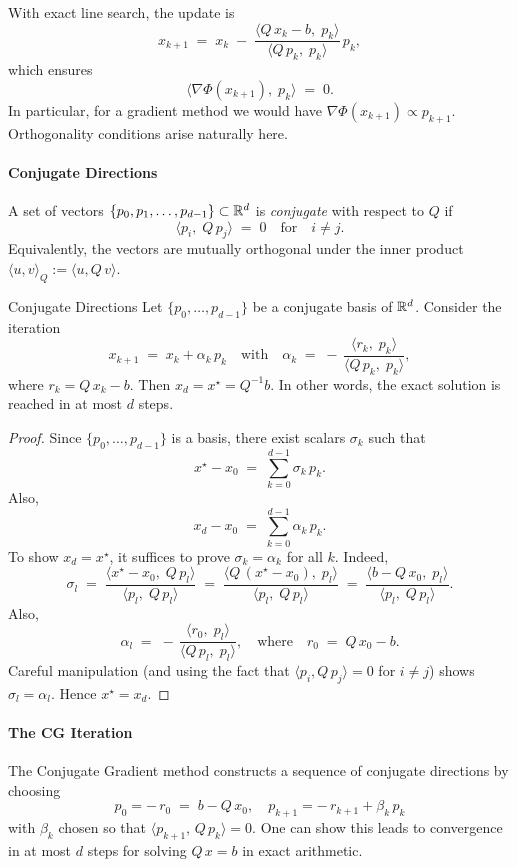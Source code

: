 With exact line search, the update is
\[
  x_{k+1}
  \;=\; x_k \;-\; \frac{\langle Q\,x_k - b,\;p_k\rangle}{\langle Q\,p_k,\;p_k\rangle}\,p_k,
\]
which ensures
\[
  \langle \nabla \Phi(x_{k+1}),\;p_k\rangle \;=\; 0.
\]
In particular, for a gradient method we would have \(\nabla \Phi(x_{k+1}) \propto p_{k+1}\). Orthogonality conditions arise naturally here.

\paragraph{Conjugate Directions}
A set of vectors \(\{p_0, p_1, \dots, p_{d-1}\}\subset \mathbb{R}^d\) is \emph{conjugate} with respect to \(Q\) if
\[
  \langle p_i,\;Q\,p_j\rangle \;=\; 0 \quad\text{for}\quad i\neq j.
\]
Equivalently, the vectors are mutually orthogonal under the inner product \(\langle u, v \rangle_Q := \langle u, Q\,v\rangle\).

\begin{lemma}{Conjugate Directions}{}
  Let \(\{p_0,\ldots,p_{d-1}\}\) be a conjugate basis of \(\mathbb{R}^d\). Consider the iteration
  \[
    x_{k+1} \;=\; x_k + \alpha_k\,p_k
    \quad\text{with}\quad
    \alpha_k \;=\; -\,\frac{\langle r_k,\;p_k\rangle}{\langle Q\,p_k,\;p_k\rangle},
  \]
  where \(r_k = Q\,x_k - b\). Then \(x_d = x^\star = Q^{-1}b\). In other words, the exact solution is reached in at most \(d\) steps.
\end{lemma}

\begin{proof}{}{}
  Since \(\{p_0,\ldots,p_{d-1}\}\) is a basis, there exist scalars \(\sigma_k\) such that
  \[
    x^\star - x_0
    \;=\; \sum_{k=0}^{d-1} \sigma_k\,p_k.
  \]
  Also,
  \[
    x_d - x_0
    \;=\; \sum_{k=0}^{d-1} \alpha_k\,p_k.
  \]
  To show \(x_d = x^\star\), it suffices to prove \(\sigma_k = \alpha_k\) for all \(k\). Indeed,
  \[
    \sigma_l
    \;=\; \frac{\langle x^\star - x_0,\;Q\,p_l\rangle}{\langle p_l,\;Q\,p_l\rangle}
    \;=\; \frac{\langle Q\,(x^\star - x_0),\;p_l\rangle}{\langle p_l,\;Q\,p_l\rangle}
    \;=\; \frac{\langle b - Q\,x_0,\;p_l\rangle}{\langle p_l,\;Q\,p_l\rangle}.
  \]
  Also,
  \[
    \alpha_l
    \;=\; -\,\frac{\langle r_0,\;p_l\rangle}{\langle Q\,p_l,\;p_l\rangle},
    \quad\text{where}\quad r_0 \;=\; Q\,x_0 - b.
  \]
  Careful manipulation (and using the fact that \(\langle p_i, Q\,p_j\rangle=0\) for \(i\neq j\)) shows \(\sigma_l = \alpha_l\). Hence \(x^\star = x_d\).
\end{proof}

\paragraph{The CG Iteration}
The Conjugate Gradient method constructs a sequence of conjugate directions by choosing
\[
  p_0 = -\,r_0 \;=\; b - Q\,x_0,
  \quad
  p_{k+1} = -\,r_{k+1} + \beta_k\,p_k
\]
with \(\beta_k\) chosen so that \(\langle p_{k+1},\,Q\,p_k\rangle=0\). One can show this leads to convergence in at most \(d\) steps for solving \(Q\,x = b\) in exact arithmetic.

